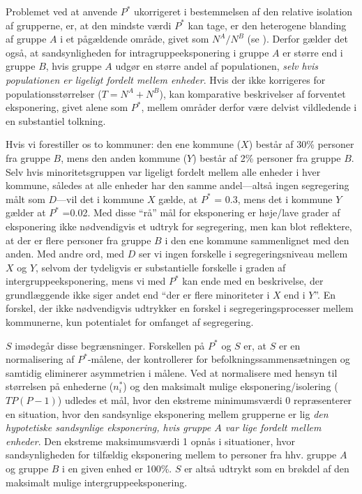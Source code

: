 \documentclass[
]{book}
\begin{document}
Problemet ved at anvende \(P^{*}\) ukorrigeret i bestemmelsen af den relative isolation af grupperne, er, at den mindste værdi \(P^{*}\) kan tage, er den heterogene blanding af gruppe \(A\) i et pågældende område, givet som \(N^{A}/N^{B}\) (se ). Derfor gælder det også, at sandsynligheden for intragruppeeksponering i gruppe \(A\) er større end i gruppe \(B\), hvis gruppe \(A\) udgør en større andel af populationen, \emph{selv hvis populationen er ligeligt fordelt mellem enheder}. Hvis der ikke korrigeres for populationsstørrelser (\(T=N^{A}+N^{B}\)), kan komparative beskrivelser af forventet eksponering, givet alene som \(P^{*}\), mellem områder derfor være delvist vildledende i en substantiel tolkning.

Hvis vi forestiller os to kommuner: den ene kommune (\(X\)) består af 30\% personer fra gruppe \(B\), mens den anden kommune (\(Y\)) består af 2\% personer fra gruppe \(B\). Selv hvis minoritetsgruppen var ligeligt fordelt mellem alle enheder i hver kommune, således at alle enheder har den samme andel---altså ingen segregering målt som \(D\)---vil det i kommune \(X\) gælde, at \(P^{*}\) = 0.3, mens det i kommune \(Y\) gælder at \(P^{*}\) =0.02. Med disse ``rå'' mål for eksponering er høje/lave grader af eksponering ikke nødvendigvis et udtryk for segregering, men kan blot reflektere, at der er flere personer fra gruppe \(B\) i den ene kommune sammenlignet med den anden. Med andre ord, med \(D\) ser vi ingen forskelle i segregeringsniveau mellem \(X\) og \(Y\), selvom der tydeligvis er substantielle forskelle i graden af intergruppeeksponering, mens vi med \(P^{*}\) kan ende med en beskrivelse, der grundlæggende ikke siger andet end ``der er flere minoriteter i \(X\) end i \(Y\)''. En forskel, der ikke nødvendigvis udtrykker en forskel i segregeringsprocesser mellem kommunerne, kun potentialet for omfanget af segregering.

\(S\) imødegår disse begrænsninger. Forskellen på \(P^{*}\) og \(S\) er, at \(S\) er en normalisering af \(P^{*}\)-målene, der kontrollerer for befolkningssammensætningen og samtidig eliminerer asymmetrien i målene. Ved at normalisere med hensyn til størrelsen på enhederne (\(n_{i}^{*}\)) og den maksimalt mulige eksponering/isolering (\(TP(P-1)\)) udledes et mål, hvor den ekstreme minimumsværdi 0 repræsenterer en situation, hvor den sandsynlige eksponering mellem grupperne er lig \emph{den hypotetiske sandsynlige eksponering, hvis gruppe \(A\) var lige fordelt mellem enheder}. Den ekstreme maksimumsværdi 1 opnås i situationer, hvor sandsynligheden for tilfældig eksponering mellem to personer fra hhv. gruppe \(A\) og gruppe \(B\) i en given enhed er 100\%. \(S\) er altså udtrykt som en brøkdel af den maksimalt mulige intergruppeeksponering.
\end{document}
